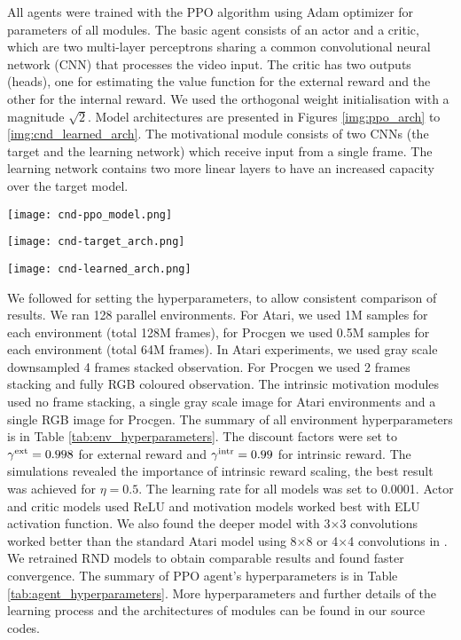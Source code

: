 \documentclass[a4paper,11pt]{elsarticle}
\begin{document}
All agents were trained with the PPO algorithm \citep{schulman2017proximal} using Adam optimizer \citep{kingma2015adam} for parameters of all modules. The basic agent consists of an actor and a critic, which are two multi-layer perceptrons sharing a common convolutional neural network (CNN) that processes the video input. The critic has two outputs (heads), one for estimating the value function for the external reward and the other for the internal reward. We used the orthogonal weight initialisation with a magnitude $\sqrt{2}$. 
Model architectures are presented in Figures \ref{img:ppo_arch} to \ref{img:cnd_learned_arch}. 
The motivational module consists of two CNNs (the target and the learning network) which receive input from a single frame. The learning network contains two more linear layers to have an increased capacity over the target model. 

\begin{figure*}[t!]
\centering
\texttt{[image: cnd-ppo\_model.png]}
\caption{The PPO agent model architecture.}
\label{img:ppo_arch}
\end{figure*}
\begin{figure*}[t!]
\centering
\texttt{[image: cnd-target\_arch.png]}
\caption{The target model architecture.}
\label{img:cnd_target_arch}
\end{figure*}
\begin{figure*}[t!]
\centering
\texttt{[image: cnd-learned\_arch.png]}
\caption{The learning model architecture.}
\label{img:cnd_learned_arch}
\end{figure*}

We followed \citep{burda2018exploration} for setting the hyperparameters, to allow consistent comparison of results. 
We ran 128 parallel environments.
For Atari, we used 1M samples for each environment  (total 128M frames), for Procgen we used 0.5M samples for each environment (total 64M frames). 
In Atari experiments, we used gray scale downsampled 4 frames stacked observation. 
For Procgen we used 2 frames stacking and fully RGB coloured observation. The intrinsic motivation modules used no frame stacking, a single gray scale image for Atari  environments and a single RGB image for Procgen.
The summary of all environment hyperparameters is in Table \ref{tab:env_hyperparameters}.
The discount factors were set to $\gamma^{\rm ext} = 0.998$ for external reward and $\gamma^{\rm intr} = 0.99$ for intrinsic reward.
The simulations revealed the importance of intrinsic reward scaling, the best result was achieved for $\eta = 0.5$.
The learning rate for all models was set to 0.0001. Actor and critic models used ReLU and motivation models worked best with ELU activation function. We also found the deeper model with 3$\times$3 convolutions worked better than the standard Atari model using 8$\times$8 or 4$\times$4 convolutions in \citep{mnih2013playing}. We retrained RND models to obtain comparable results and found faster convergence. The summary of PPO agent's hyperparameters is in Table \ref{tab:agent_hyperparameters}.
More hyperparameters and further details of the learning process and the architectures of modules can be found in our source codes.
\end{document}

